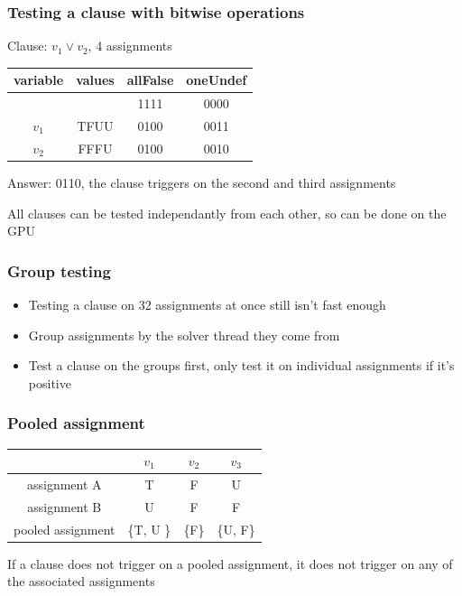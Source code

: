 \documentclass{beamer}
\begin{document}
\begin{frame}
\frametitle{Testing a clause with bitwise operations}

Clause: $v_1 \lor v_2$, 4 assignments
\begin{center}
\begin{tabular}{ | c | c | c | c |}
\hline
variable & values & allFalse & oneUndef \\ 
\hline
 & & 1111 & 0000 \\
$v_1$ & TFUU & 0100 & 0011 \\  
$v_2$ & FFFU & 0100 & 0010 \\  
\hline
\end{tabular}
\end{center}
Answer: 0110, the clause triggers on the second and third assignments


All clauses can be tested independantly from each other, so can be done on the GPU

\end{frame}

\begin{frame}
\frametitle{Group testing}
\begin{itemize}
\item Testing a clause on 32 assignments at once still isn't fast enough
\item Group assignments by the solver thread they come from
\item Test a clause on the groups first, only test it on individual assignments if it's positive
\end{itemize}
\end{frame}

\begin{frame}
\frametitle{Pooled assignment}
\begin{center}
\begin{tabular}{ | c | c | c | c |}
\hline
 & $v_1$ & $v_2$ & $v_3$\\ 
\hline
assignment A & T & F & U \\  
assignment B & U & F & F \\    
\hline
pooled assignment & \{T, U \} & \{F\} & \{U, F\}\\
\hline
\end{tabular}
\end{center}

If a clause does not trigger on a pooled assignment, it does not trigger on any of the associated assignments
\end{frame}
\end{document}
